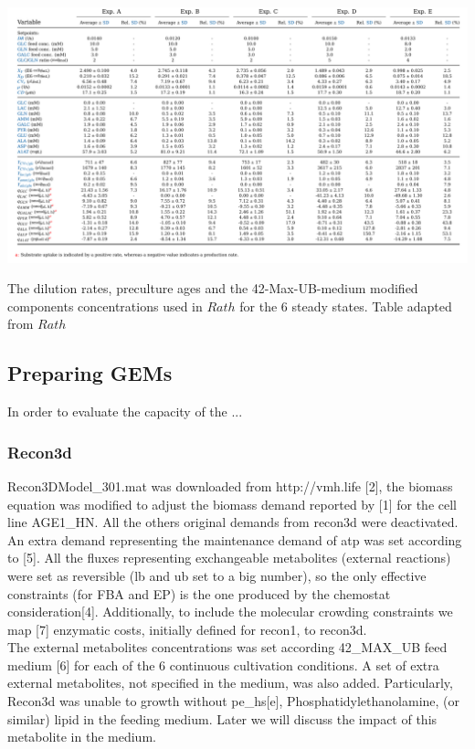 \documentclass[]{article}
\begin{document}
	\begin{table}
		\includegraphics[scale = 0.7]{Table_4_11}
		\caption{The dilution rates, preculture ages and the 42-Max-UB-medium modified components concentrations used in $Rath$ for the 6 steady states. Table adapted from $Rath$}
		
	\end{table}

\subsection{Preparing GEMs} %
	
	In order to evaluate the capacity of the ...
	
	\subsubsection{Recon3d}

	Recon3DModel\_301.mat was downloaded from http://vmh.life [2], the biomass equation was modified to adjust the biomass demand reported by [1] for the cell line AGE1\_HN. All the others original demands from recon3d were deactivated. An extra demand representing the maintenance demand of atp was set according to [5]. All the fluxes representing exchangeable metabolites (external reactions) were set as reversible (lb and ub set to a big number), so the only effective constraints (for FBA and EP) is the one produced by the chemostat consideration[4]. Additionally, to include the molecular crowding constraints we map [7] enzymatic costs, initially defined for recon1, to recon3d.\\
	The external metabolites concentrations was set according 42\_MAX\_UB feed medium [6] for each of the 6 continuous cultivation conditions. A set of extra external metabolites, not specified in the medium, was also added. Particularly, Recon3d was unable to growth without pe\_hs[e], Phosphatidylethanolamine,  (or similar) lipid in the feeding medium. Later we will discuss the impact of this metabolite in the medium.
	
\end{document}
